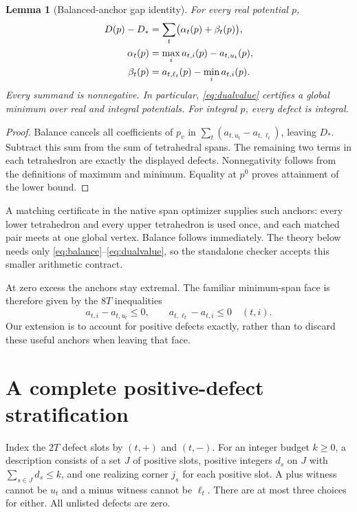 \documentclass[11pt,letterpaper]{article}
\newtheorem{lemma}[theorem]{Lemma}
\theoremstyle{definition}
\begin{document}
\begin{lemma}[Balanced-anchor gap identity]\label{lem:gap}
For every real potential $p$,
\begin{align}
 D(p)-D_* &=\sum_t\bigl(\alpha_t(p)+\beta_t(p)\bigr),\label{eq:gap}\\
 \alpha_t(p)&=\max_i a_{t,i}(p)-a_{t,u_t}(p),\notag\\
 \beta_t(p)&=a_{t,\ell_t}(p)-\min_i a_{t,i}(p).\notag
\end{align}
Every summand is nonnegative. In particular, \eqref{eq:dualvalue} certifies a global minimum over real and integral potentials. For integral $p$, every defect is integral.
\end{lemma}
\begin{proof}
Balance cancels all coefficients of $p_v$ in $\sum_t(a_{t,u_t}-a_{t,\ell_t})$, leaving $D_*$. Subtract this sum from the sum of tetrahedral spans. The remaining two terms in each tetrahedron are exactly the displayed defects. Nonnegativity follows from the definitions of maximum and minimum. Equality at $p^0$ proves attainment of the lower bound.
\end{proof}

A matching certificate in the native span optimizer supplies such anchors: every lower tetrahedron and every upper tetrahedron is used once, and each matched pair meets at one global vertex. Balance follows immediately. The theory below needs only \eqref{eq:balance}--\eqref{eq:dualvalue}, so the standalone checker accepts this smaller arithmetic contract.

At zero excess the anchors stay extremal. The familiar minimum-span face is therefore given by the $8T$ inequalities
\begin{equation}\label{eq:zeroface}
 a_{t,i}-a_{t,u_t}\leq0,\qquad
 a_{t,\ell_t}-a_{t,i}\leq0 \quad(t,i).
\end{equation}
Our extension is to account for positive defects exactly, rather than to discard these useful anchors when leaving that face.

\section{A complete positive-defect stratification}\label{sec:strata}
Index the $2T$ defect slots by $(t,+)$ and $(t,-)$. For an integer budget $k\geq0$, a description consists of a set $J$ of positive slots, positive integers $d_s$ on $J$ with $\sum_{s\in J}d_s\leq k$, and one realizing corner $j_s$ for each positive slot. A plus witness cannot be $u_t$ and a minus witness cannot be $\ell_t$. There are at most three choices for either. All unlisted defects are zero.
\end{document}
